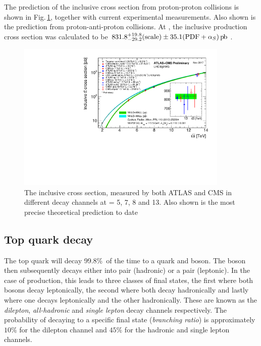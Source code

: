 The prediction of the inclusive \ttbar{} cross section from proton-proton collisions is shown in Fig.\,\ref{fig:incttbar}, together with current experimental measurements. 
Also shown is the prediction from proton-anti-proton collisions.
At \com{}, the inclusive \ttbar{} production cross section was calculated to be $831.8^{+19.8}_{-29.2}(\text{scale})\pm35.1(\text{PDF}+\alpha_S)\,\text{p\hspace{-.08em}b}$\,\cite{TOPpp}.
\begin{figure}[htpb]
	\centering
	\includegraphics[width=0.9\textwidth]{Figures/tt_curve_sqrts_cms}
	\caption[The inclusive \ttbar cross section, measured by both ATLAS and CMS in different decay channels at \sqrts{} = 5, 7, 8 and 13\TeV{}. Also shown is the most precise theoretical prediction to date.]{ The inclusive \ttbar cross section, measured by both ATLAS and CMS in different decay channels at \sqrts{} = 5, 7, 8 and 13\TeV{}. Also shown is the most precise theoretical prediction to date\,\cite{LHCTopWG_Plots} }
	\label{fig:incttbar}
\end{figure}

\subsection{Top quark decay} %
\label{sub:top_quark_decay}

The top quark will decay 99.8\%\,\cite{PDG} of the time to a \bquark{} quark and \Wboson{} boson.
The \Wboson{} boson then subsequently decays either into \qpqbar{} pair (hadronic) or a \lepton{}\neutrinobar{} pair (leptonic).
In the case of \ttbar{} production, this leads to three classes of final states, the first where both \Wboson{} bosons decay leptonically, the second where both decay  hadronically and lastly where one decays leptonically and the other hadronically.
These are known as the \textit{dilepton}, \textit{all-hadronic} and \textit{single lepton} decay channels respectively.
The probability of decaying to a specific final state (\textit{branching ratio}) is approximately $10\%$ for the dilepton channel and $45\%$ for the hadronic and single lepton channels.

